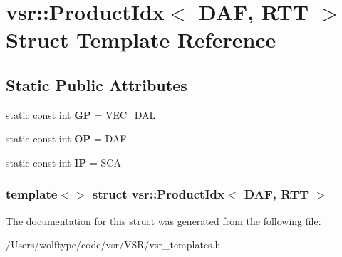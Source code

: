 \hypertarget{structvsr_1_1_product_idx_3_01_d_a_f_00_01_r_t_t_01_4}{\section{vsr\-:\-:Product\-Idx$<$ D\-A\-F, R\-T\-T $>$ Struct Template Reference}
\label{structvsr_1_1_product_idx_3_01_d_a_f_00_01_r_t_t_01_4}
}
\subsection*{Static Public Attributes}
\begin{DoxyCompactItemize}
\item 
\hypertarget{structvsr_1_1_product_idx_3_01_d_a_f_00_01_r_t_t_01_4_a515e128d421d4ff240943afc72106aea}{static const int {\bfseries G\-P} = V\-E\-C\-\_\-\-D\-A\-L}\label{structvsr_1_1_product_idx_3_01_d_a_f_00_01_r_t_t_01_4_a515e128d421d4ff240943afc72106aea}

\item 
\hypertarget{structvsr_1_1_product_idx_3_01_d_a_f_00_01_r_t_t_01_4_a231deeaecaf81bb7eab556b714f70209}{static const int {\bfseries O\-P} = D\-A\-F}\label{structvsr_1_1_product_idx_3_01_d_a_f_00_01_r_t_t_01_4_a231deeaecaf81bb7eab556b714f70209}

\item 
\hypertarget{structvsr_1_1_product_idx_3_01_d_a_f_00_01_r_t_t_01_4_ad3a307ce2a8609b50cd8501b8c027d36}{static const int {\bfseries I\-P} = S\-C\-A}\label{structvsr_1_1_product_idx_3_01_d_a_f_00_01_r_t_t_01_4_ad3a307ce2a8609b50cd8501b8c027d36}

\end{DoxyCompactItemize}
\subsubsection*{template$<$$>$ struct vsr\-::\-Product\-Idx$<$ D\-A\-F, R\-T\-T $>$}



The documentation for this struct was generated from the following file\-:\begin{DoxyCompactItemize}
\item 
/\-Users/wolftype/code/vsr/\-V\-S\-R/vsr\-\_\-templates.\-h\end{DoxyCompactItemize}
